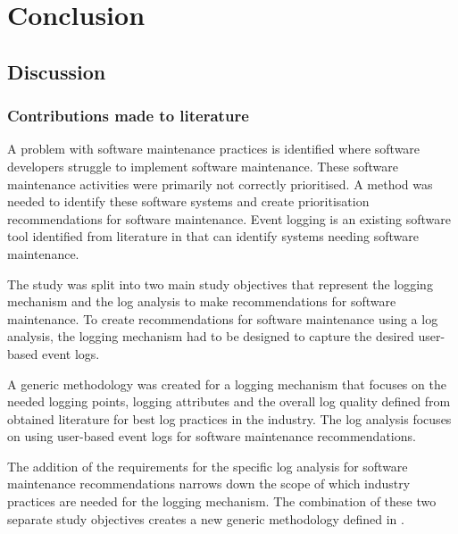 \chapter{Conclusion}
\label{chap:4}

\section{Discussion}

\subsection{Contributions made to literature}
A problem with software maintenance practices is identified where software developers struggle to
implement software maintenance. These software maintenance activities were primarily not correctly
prioritised. A method was needed to identify these software systems and create prioritisation
recommendations for software maintenance. Event logging is an existing software tool identified from
literature in  that can identify systems needing software maintenance. \par The study
was split into two main study objectives that represent the logging mechanism and the log analysis
to make recommendations for software maintenance. To create recommendations for software maintenance
using a log analysis, the logging mechanism had to be designed to capture the desired user-based
event logs. \par A generic methodology was created for a logging mechanism that focuses on the
needed logging points, logging attributes and the overall log quality defined from obtained
literature for best log practices in the industry. The log analysis focuses on using user-based
event logs for software maintenance recommendations.\par The addition of the requirements for the
specific log analysis for software maintenance recommendations narrows down the scope of which
industry practices are needed for the logging mechanism. The combination of these two separate study
objectives creates a new generic methodology defined in .

